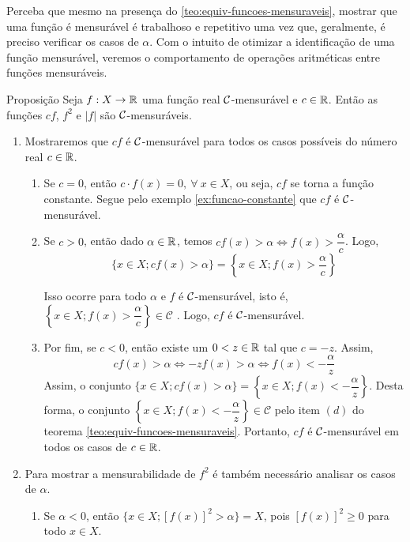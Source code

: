 Perceba que mesmo na presença do \ref{teo:equiv-funcoes-mensuraveis}, mostrar que uma função é mensurável é trabalhoso e repetitivo uma vez que, geralmente, é preciso verificar os casos de $\alpha$.
Com o intuito de otimizar a identificação de uma função mensurável, veremos o comportamento de operações aritméticas entre funções mensuráveis.
%
\begin{env}{Proposição}
\label{prop:aritmetica-uma-funcao}
Seja $f: X \to \mathbb{R}$ uma função real $\operatorname{\mathcal{C}}$-mensurável e $c \in \mathbb{R}$. Então as funções $cf$, $f^2$ e $|f|$ são $\operatorname{\mathcal{C}}$-mensuráveis. 
\vspace{-0.2cm}
\end{env}
\begin{prova}
	\vspace{-0.8cm}
    \begin{enumerate}[label*=(\alph*)]
        \item Mostraremos que $cf$ é $\operatorname{\mathcal{C}}$-mensurável para todos os casos possíveis do número real $c \in \mathbb{R}$.
            \begin{enumerate}[label=(\roman*)]
                \item Se $c = 0$, então $c\cdot f(x) = 0, \ \forall \ x \in X$, ou seja, $cf$ se torna a função constante. Segue pelo exemplo \ref{ex:funcao-constante} que $cf$ é $\operatorname{\mathcal{C}}$-mensurável.
                
                \item Se $c>0$, então  dado $\alpha \in \mathbb{R}$, temos $cf(x) > \alpha \Leftrightarrow f(x) >\dfrac{\alpha}{c}$. 
                Logo, 
                $$
                \{x \in X; cf(x) > \alpha\} 
                = 
                \left\{x \in X; f(x) > \dfrac{\alpha}{c}\right\}
                $$
                    
                Isso ocorre para todo $\alpha$ e $f$ é $\operatorname{\mathcal{C}}$-mensurável, isto é, $\left\{x \in X; f(x) > \dfrac{\alpha}{c}\right\} \in \mathcal{C}$  . Logo, $cf$ é $\operatorname{\mathcal{C}}$-mensurável.
                
                \item Por fim, se $c < 0$, então existe um $ 0 < z \in \mathbb{R}$ tal que $c = -z$.
                Assim, 
                $$cf(x) >\alpha \Leftrightarrow -zf(x) >\alpha \Leftrightarrow f(x) < -\dfrac{\alpha}{z}$$
                Assim, o conjunto $\{x \in X; cf(x) > \alpha \} = \left\{x \in X; f(x) < -\dfrac{\alpha}{z}\right\}$.
                Desta forma, o conjunto  $\left\{x \in X; f(x) < -\dfrac{\alpha}{z}\right\}  \in \mathcal{C}$ pelo  item $(d)$ do teorema \ref{teo:equiv-funcoes-mensuraveis}. Portanto,  $cf$ é $\operatorname{\mathcal{C}}$-mensurável em todos os casos de $c \in \mathbb{R}$.
            \end{enumerate}
        \item Para mostrar a mensurabilidade de $f^2$ é também necessário analisar os casos de $\alpha$.
            \begin{enumerate}[label = (\roman*)]
                \item Se $\alpha < 0$, então $\{x \in X; [f(x)]^2 > \alpha\} = X$, pois $[f(x)]^2 \geq 0$ para todo $x \in X$.
                

\end{enumerate}
\end{enumerate}
\end{prova}
